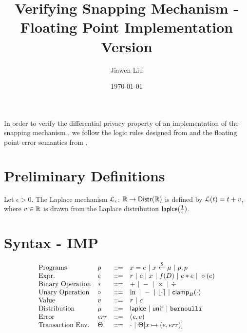 \documentclass[a4paper,11pt]{article}
\begin{document}
\title{Verifying Snapping Mechanism - Floating Point Implementation Version}
\author{Jiawen Liu}

\date{\today}

\maketitle
In order to verify the differential privacy property of an implementation of the snapping mechanism \cite{mironov2012significance}, we follow the logic rules designed from \cite{barthe2016proving} and the floating point error semantics from \cite{Ramananandro2016unified,Martel2006higher,Becker2018verified,Moscato2017Automatic}.

\section{Preliminary Definitions}
\begin{defn}
Let $\epsilon > 0$. The Laplace mechanism  $\mathcal{L}_{\epsilon}$: $\mathbb{R} \to \mathsf{Distr}(\mathbb{R})$ is defined by $\mathcal{L}(t) = t + v$, where $v \in \mathbb{R}$ is drawn from the Laplace distribution $\mathsf{laplce}(\frac{1}{\epsilon})$.
\end{defn}
%
%
%

\section{Syntax - IMP}
\[\begin{array}{llll}
\mbox{Programs} & \prog & ::= & 
     \varx = \expr ~|~ \varx \samplel \edistr
	~|~ \prog ; \prog \\

\mbox{Expr.} & \expr & ::= & \rval ~|~  \fval
	~|~ \varx ~|~ f(\data) ~|~ \expr \bop \expr
	~|~ \uop (\expr) \\
%
\mbox{Binary Operation} & \bop & ::= & + ~|~ - ~|~ \times ~|~ \div \\
%
\mbox{Unary Operation} & \uop & ::= & \ln ~|~ - ~|~ \round{\cdot} 
	~|~ \clamp_B(\cdot) \\
%
\mbox{Value} & \valv & ::= & \rval ~|~  \fval \\
%
\mbox{Distribution} & \edistr & ::= & \laplace ~|~ \uniform ~|~ \bernoulli \\ 
%
\mbox{Error} & \err & ::= & (\expr, \expr) \\
%
\mbox{Transaction Env.} & \trsenv & ::= & \cdot ~|~ \trsenv[x \mapsto (\expr, \err)] 
\end{array}
\]
\end{document}
